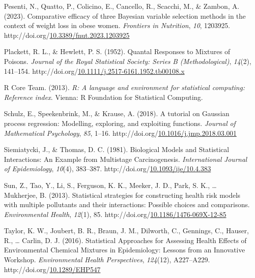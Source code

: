 \documentclass[12pt, twoside]{amherstthesis}
\newenvironment{CSLReferences}[2]%
  {}%
  {\par}
\begin{document}
\begin{CSLReferences}{1}{0}
\leavevmode{}%
Pesenti, N., Quatto, P., Colicino, E., Cancello, R., Scacchi, M., \& Zambon, A. (2023). Comparative efficacy of three {Bayesian} variable selection methods in the context of weight loss in obese women. \emph{Frontiers in Nutrition}, \emph{10}, 1203925. http://doi.org/\href{https://doi.org/10.3389/fnut.2023.1203925}{10.3389/fnut.2023.1203925}

\leavevmode{}%
Plackett, R. L., \& Hewlett, P. S. (1952). Quantal {Responses} to {Mixtures} of {Poisons}. \emph{Journal of the Royal Statistical Society: Series B (Methodological)}, \emph{14}(2), 141--154. http://doi.org/\href{https://doi.org/10.1111/j.2517-6161.1952.tb00108.x}{10.1111/j.2517-6161.1952.tb00108.x}

\leavevmode{}%
R Core Team. (2013). \emph{R: A language and environment for statistical computing: Reference index}. Vienna: R Foundation for Statistical Computing.

\leavevmode{}%
Schulz, E., Speekenbrink, M., \& Krause, A. (2018). A tutorial on {Gaussian} process regression: {Modelling}, exploring, and exploiting functions. \emph{Journal of Mathematical Psychology}, \emph{85}, 1--16. http://doi.org/\href{https://doi.org/10.1016/j.jmp.2018.03.001}{10.1016/j.jmp.2018.03.001}

\leavevmode{}%
Siemiatycki, J., \& Thomas, D. C. (1981). Biological {Models} and {Statistical} {Interactions}: An {Example} from {Multistage} {Carcinogenesis}. \emph{International Journal of Epidemiology}, \emph{10}(4), 383--387. http://doi.org/\href{https://doi.org/10.1093/ije/10.4.383}{10.1093/ije/10.4.383}

\leavevmode{}%
Sun, Z., Tao, Y., Li, S., Ferguson, K. K., Meeker, J. D., Park, S. K., \ldots{} Mukherjee, B. (2013). Statistical strategies for constructing health risk models with multiple pollutants and their interactions: Possible choices and comparisons. \emph{Environmental Health}, \emph{12}(1), 85. http://doi.org/\href{https://doi.org/10.1186/1476-069X-12-85}{10.1186/1476-069X-12-85}

\leavevmode{}%
Taylor, K. W., Joubert, B. R., Braun, J. M., Dilworth, C., Gennings, C., Hauser, R., \ldots{} Carlin, D. J. (2016). Statistical {Approaches} for {Assessing} {Health} {Effects} of {Environmental} {Chemical} {Mixtures} in {Epidemiology}: {Lessons} from an {Innovative} {Workshop}. \emph{Environmental Health Perspectives}, \emph{124}(12), A227--A229. http://doi.org/\href{https://doi.org/10.1289/EHP547}{10.1289/EHP547}


\end{CSLReferences}
\end{document}
